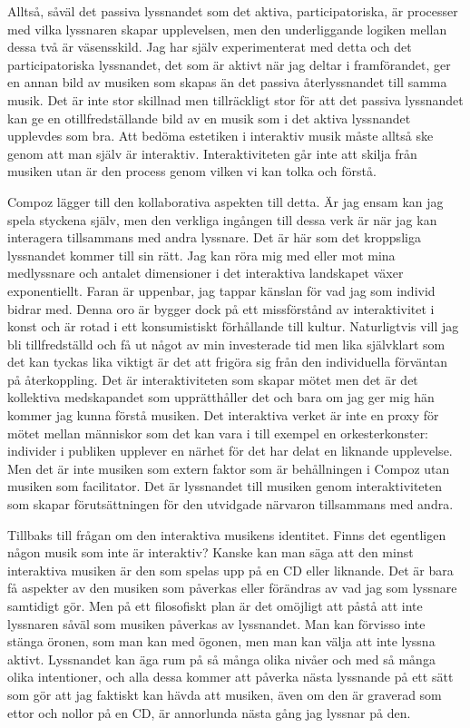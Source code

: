 \documentclass[12pt]{article}
\begin{document}
Alltså, såväl det passiva lyssnandet som det aktiva, participatoriska, är processer med vilka lyssnaren skapar upplevelsen, men den underliggande logiken mellan dessa två är väsensskild. Jag har själv experimenterat med detta och det participatoriska lyssnandet, det som är aktivt när jag deltar i framförandet, ger en annan bild av musiken som skapas än det passiva återlyssnandet till samma musik. Det är inte stor skillnad men tillräckligt stor för att det passiva lyssnandet kan ge en otillfredställande bild av en musik som i det aktiva lyssnandet upplevdes som bra. Att bedöma estetiken i interaktiv musik måste alltså ske genom att man själv är interaktiv. Interaktiviteten går inte att skilja från musiken utan är den process genom vilken vi kan tolka och förstå.

Compoz lägger till den kollaborativa aspekten till detta. Är jag ensam kan jag spela styckena själv, men den verkliga ingången till dessa verk är när jag kan interagera tillsammans med andra lyssnare. Det är här som det kroppsliga lyssnandet kommer till sin rätt. Jag kan röra mig med eller mot mina medlyssnare och antalet dimensioner i det interaktiva landskapet växer exponentiellt. Faran är uppenbar, jag tappar känslan för vad jag som individ bidrar med. Denna oro är bygger dock på ett missförstånd av interaktivitet i konst och är rotad i ett konsumistiskt förhållande till kultur. Naturligtvis vill jag bli tillfredställd och få ut något av min investerade tid men lika självklart som det kan tyckas lika viktigt är det att frigöra sig från den individuella förväntan på återkoppling. Det är interaktiviteten som skapar mötet men det är det kollektiva medskapandet som upprätthåller det och bara om jag ger mig hän kommer jag kunna förstå musiken. Det interaktiva verket är inte en proxy för mötet mellan människor som det kan vara i till exempel en orkesterkonster: individer i publiken upplever en närhet för det har delat en liknande upplevelse. Men det är inte musiken som extern faktor som är behållningen i Compoz utan musiken som facilitator. Det är lyssnandet till musiken genom interaktiviteten som skapar förutsättningen för den utvidgade närvaron tillsammans med andra.

Tillbaks till frågan om den interaktiva musikens identitet. Finns det egentligen någon musik som inte är interaktiv? Kanske kan man säga att den minst interaktiva musiken är den som spelas upp på en CD eller liknande. Det är bara få aspekter av den musiken som påverkas eller förändras av vad jag som lyssnare samtidigt gör. Men på ett filosofiskt plan är det omöjligt att påstå att inte lyssnaren såväl som musiken påverkas av lyssnandet. Man kan förvisso inte stänga öronen, som man kan med ögonen, men man kan välja att inte lyssna aktivt. Lyssnandet kan äga rum på så många olika nivåer och med så många olika intentioner, och alla dessa kommer att påverka nästa lyssnande på ett sätt som gör att jag faktiskt kan hävda att musiken, även om den är graverad som ettor och nollor på en CD, är annorlunda nästa gång jag lyssnar på den.
\end{document}
